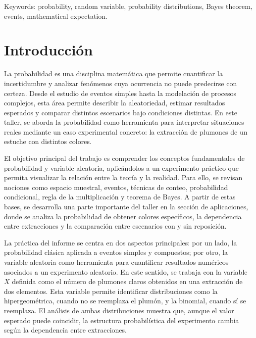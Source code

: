 \documentclass[10pt,letterpaper]{article}
\begin{document}
Keywords: probability, random variable, probability distributions, Bayes theorem, events, mathematical expectation.

\clearpage
\tableofcontents
\clearpage

\section{Introducción}
La probabilidad es una disciplina matemática que permite cuantificar la incertidumbre y analizar fenómenos cuya ocurrencia no puede predecirse con certeza. Desde el estudio de eventos simples hasta la modelación de procesos complejos, esta área permite describir la aleatoriedad, estimar resultados esperados y comparar distintos escenarios bajo condiciones distintas. En este taller, se aborda la probabilidad como herramienta para interpretar situaciones reales mediante un caso experimental concreto: la extracción de plumones de un estuche con distintos colores.

El objetivo principal del trabajo es comprender los conceptos fundamentales de probabilidad y variable aleatoria, aplicándolos a un experimento práctico que permita visualizar la relación entre la teoría y la realidad. Para ello, se revisan nociones como espacio muestral, eventos, técnicas de conteo, probabilidad condicional, regla de la multiplicación y teorema de Bayes. A partir de estas bases, se desarrolla una parte importante del taller en la sección de aplicaciones, donde se analiza la probabilidad de obtener colores específicos, la dependencia entre extracciones y la comparación entre escenarios con y sin reposición.

La práctica del informe se centra en dos aspectos principales: por un lado, la probabilidad clásica aplicada a eventos simples y compuestos; por otro, la variable aleatoria como herramienta para cuantificar resultados numéricos asociados a un experimento aleatorio. En este sentido, se trabaja con la variable $X$ definida como el número de plumones claros obtenidos en una extracción de dos elementos. Esta variable permite identificar distribuciones como la hipergeométrica, cuando no se reemplaza el plumón, y la binomial, cuando sí se reemplaza. El análisis de ambas distribuciones muestra que, aunque el valor esperado puede coincidir, la estructura probabilística del experimento cambia según la dependencia entre extracciones.
\end{document}
